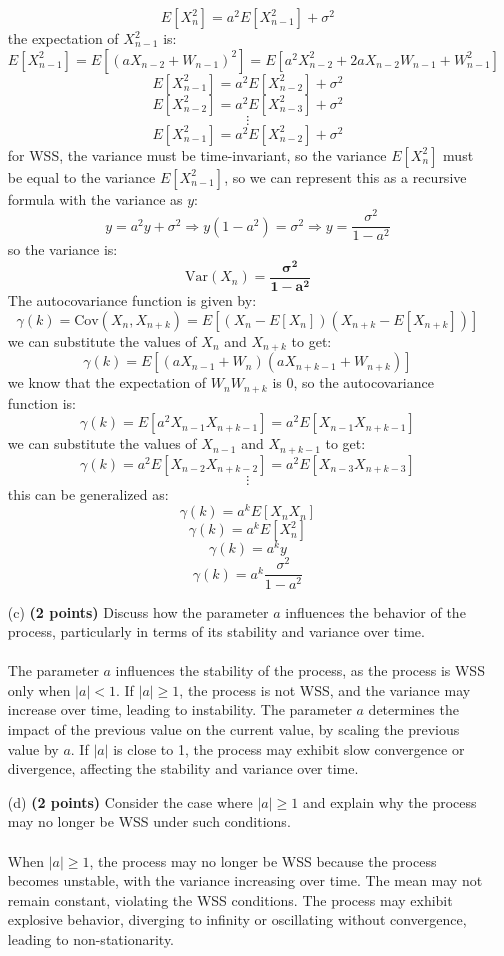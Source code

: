 \documentclass{article}
\begin{document}
\begin{itemize}
    \[
    E[X_n^2] = a^2E[X_{n-1}^2] + \sigma^2
    \]
    the expectation of \( X_{n-1}^2 \) is:
    \[
    E[X_{n-1}^2] = E[(aX_{n-2} + W_{n-1})^2] = E[a^2X_{n-2}^2 + 2aX_{n-2}W_{n-1} + W_{n-1}^2]
    \]
    \[
    E[X_{n-1}^2] = a^2E[X_{n-2}^2] + \sigma^2
    \]
    \[
    E[X_{n-2}^2] = a^2E[X_{n-3}^2] + \sigma^2
    \]
    \[
    \vdots
    \]
    \[
    E[X_{n-1}^2] = a^2E[X_{n-2}^2] + \sigma^2
    \]
    for WSS, the variance must be time-invariant, so the variance $E[X_n^2]$ must be equal to the variance $E[X_{n-1}^2]$, so we can represent this as a recursive formula with the variance as $y$:
    \[
    y = a^2y + \sigma^2 \Rightarrow y(1 - a^2) = \sigma^2 \Rightarrow y = \frac{\sigma^2}{1 - a^2}
    \]
    so the variance is:
    \[
    \text{Var}(X_n) = \mathbf{\frac{\sigma^2}{1 - a^2}}
    \]
    The autocovariance function is given by:
    \[
    \gamma(k) = \text{Cov}(X_n, X_{n+k}) = E[(X_n - E[X_n])(X_{n+k} - E[X_{n+k}])]
    \]
    we can substitute the values of \( X_n \) and \( X_{n+k} \) to get:
    \[
    \gamma(k) = E[(aX_{n-1} + W_n)(aX_{n+k-1} + W_{n+k})]
    \]
    we know that the expectation of \( W_nW_{n+k} \) is 0, so the autocovariance function is:
    \[
    \gamma(k) = E[a^2X_{n-1}X_{n+k-1}] = a^2E[X_{n-1}X_{n+k-1}]
    \]
    we can substitute the values of \( X_{n-1} \) and \( X_{n+k-1} \) to get:
    \[
    \gamma(k) = a^2E[X_{n-2}X_{n+k-2}] = a^2E[X_{n-3}X_{n+k-3}]
    \]
    \[
    \vdots
    \]
    this can be generalized as:
    \[
    \gamma(k) = a^{k}E[X_{n}X_{n}]
    \]
    \[
    \gamma(k) = a^{k}E[X_{n}^2]
    \]
    \[
    \gamma(k) = a^{k}y
    \]
    \[
    \gamma(k) = a^{k}\frac{\sigma^2}{1 - a^2}
    \]
    \item[(c)] \textbf{(2 points)} Discuss how the parameter \( a \) influences the behavior of the process, particularly in terms of its stability and variance over time.
    \\\\ The parameter \( a \) influences the stability of the process, as the process is WSS only when \( |a| < 1 \). If \( |a| \geq 1 \), the process is not WSS, and the variance may increase over time, leading to instability. The parameter \( a \) determines the impact of the previous value on the current value, by scaling the previous value by \( a \). If \( |a| \) is close to 1, the process may exhibit slow convergence or divergence, affecting the stability and variance over time.
    \item[(d)] \textbf{(2 points)} Consider the case where \( |a| \geq 1 \) and explain why the process may no longer be WSS under such conditions.
    \\\\ When \( |a| \geq 1 \), the process may no longer be WSS because the process becomes unstable, with the variance increasing over time. The mean may not remain constant, violating the WSS conditions. The process may exhibit explosive behavior, diverging to infinity or oscillating without convergence, leading to non-stationarity.
\end{itemize}
\end{document}
